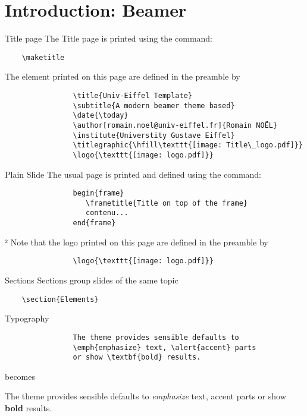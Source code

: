 	\section{Introduction: Beamer}

		\begin{frame}[fragile]{Title page}
			The Title page is printed using the command:			
			\begin{verbatim}    \maketitle\end{verbatim}
			
			The element printed on this page are defined in the preamble by
			\begin{verbatim}
				\title{Univ-Eiffel Template}
				\subtitle{A modern beamer theme based}
				\date{\today}
				\author[romain.noel@univ-eiffel.fr]{Romain NOËL}
				\institute{Universtity Gustave Eiffel}
				\titlegraphic{\hfill\texttt{[image: Title\_logo.pdf]}}
				\logo{\texttt{[image: logo.pdf]}}
			\end{verbatim}
		\end{frame}
		
		\begin{frame}[fragile]{Plain Slide}
			The usual page is printed and defined using the command:			
			\begin{verbatim}
				begin{frame}
				   \frametitle{Title on top of the frame}
				   contenu...
				end{frame}
			\end{verbatim}
			²
			Note that the logo printed on this page are defined in the preamble by
			\begin{verbatim}
				\logo{\texttt{[image: logo.pdf]}}
			\end{verbatim}
		\end{frame}
	
		\begin{frame}[fragile]{Sections}
			Sections group slides of the same topic
			
			\begin{verbatim}    \section{Elements}\end{verbatim}
		\end{frame}
	
		\begin{frame}[fragile]{Typography}
			\begin{verbatim}
				The theme provides sensible defaults to
				\emph{emphasize} text, \alert{accent} parts
				or show \textbf{bold} results.
			\end{verbatim}
			
			\begin{center}becomes\end{center}
			
			The theme provides sensible defaults to \emph{emphasize} text,
			\alert{accent} parts or show \textbf{bold} results.
		\end{frame}
			
